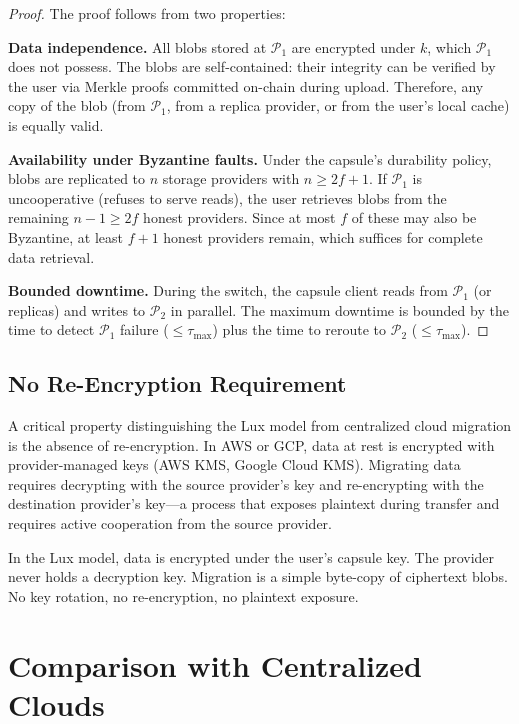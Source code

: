 \documentclass[11pt,a4paper]{article}
\begin{document}
\begin{proof}
The proof follows from two properties:

\textbf{Data independence.} All blobs stored at $\mathcal{P}_1$ are
encrypted under $k$, which $\mathcal{P}_1$ does not possess. The blobs
are self-contained: their integrity can be verified by the user via
Merkle proofs committed on-chain during upload. Therefore, any copy of
the blob (from $\mathcal{P}_1$, from a replica provider, or from the
user's local cache) is equally valid.

\textbf{Availability under Byzantine faults.} Under the capsule's
durability policy, blobs are replicated to $n$ storage providers with
$n \geq 2f + 1$. If $\mathcal{P}_1$ is uncooperative (refuses to serve
reads), the user retrieves blobs from the remaining $n - 1 \geq 2f$
honest providers. Since at most $f$ of these may also be Byzantine, at
least $f + 1$ honest providers remain, which suffices for complete data
retrieval.

\textbf{Bounded downtime.} During the switch, the capsule client reads
from $\mathcal{P}_1$ (or replicas) and writes to $\mathcal{P}_2$ in
parallel. The maximum downtime is bounded by the time to detect
$\mathcal{P}_1$ failure ($\leq \tau_{\max}$) plus the time to reroute
to $\mathcal{P}_2$ ($\leq \tau_{\max}$).
\end{proof}

\subsection{No Re-Encryption Requirement}

A critical property distinguishing the Lux model from centralized cloud
migration is the absence of re-encryption. In AWS or GCP, data at rest
is encrypted with provider-managed keys (AWS KMS, Google Cloud KMS).
Migrating data requires decrypting with the source provider's key and
re-encrypting with the destination provider's key---a process that
exposes plaintext during transfer and requires active cooperation from
the source provider.

In the Lux model, data is encrypted under the user's capsule key. The
provider never holds a decryption key. Migration is a simple byte-copy
of ciphertext blobs. No key rotation, no re-encryption, no plaintext
exposure.

\section{Comparison with Centralized Clouds}\label{sec:comparison}
\end{document}

